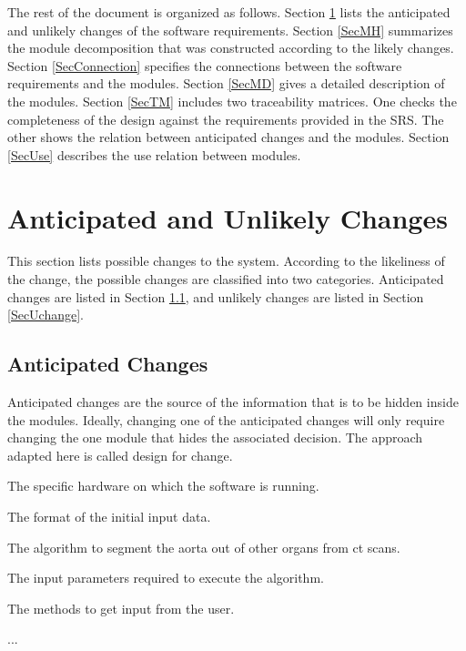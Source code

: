 \documentclass[12pt, titlepage]{article}
\newcounter{acnum}
\newcommand{\actheacnum}{AC\theacnum}
\begin{document}
The rest of the document is organized as follows. Section
\ref{SecChange} lists the anticipated and unlikely changes of the software
requirements. Section \ref{SecMH} summarizes the module decomposition that
was constructed according to the likely changes. Section \ref{SecConnection}
specifies the connections between the software requirements and the
modules. Section \ref{SecMD} gives a detailed description of the
modules. Section \ref{SecTM} includes two traceability matrices. One checks
the completeness of the design against the requirements provided in the SRS. The
other shows the relation between anticipated changes and the modules. Section
\ref{SecUse} describes the use relation between modules.

\section{Anticipated and Unlikely Changes} \label{SecChange}

This section lists possible changes to the system. According to the likeliness
of the change, the possible changes are classified into two
categories. Anticipated changes are listed in Section \ref{SecAchange}, and
unlikely changes are listed in Section \ref{SecUchange}.

\subsection{Anticipated Changes} \label{SecAchange}

Anticipated changes are the source of the information that is to be hidden
inside the modules. Ideally, changing one of the anticipated changes will only
require changing the one module that hides the associated decision. The approach
adapted here is called design for
change.

\begin{description}
\item[ \actheacnum \label{acHardware}:] The specific hardware on which the software is running.
\item[ \actheacnum \label{acInput}:] The format of the initial input data.
\item[ \actheacnum \label{acAlgo}:] The algorithm to segment the aorta out of other organs from ct scans.
\item[ \actheacnum \label{acInputParams}:] The input parameters required to execute the algorithm.
\item[ \actheacnum \label{acGetInput}:] The methods to get input from the user.

\item ...
\end{description}
\end{document}
